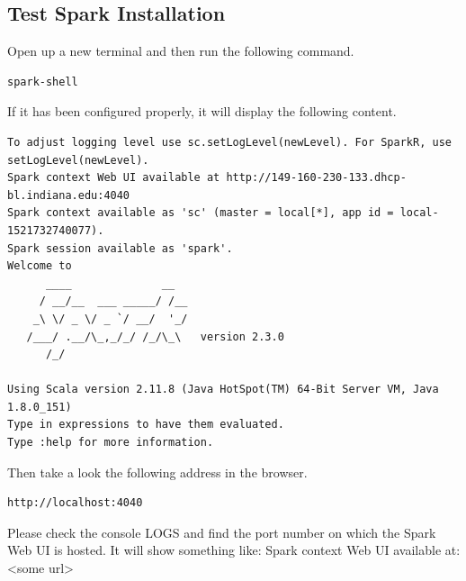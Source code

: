 \subsection{Test Spark Installation}

Open up a new terminal and then run the following command.

\begin{lstlisting}
spark-shell
\end{lstlisting}

If it has been configured properly, it will display the following content.

\begin{lstlisting}
To adjust logging level use sc.setLogLevel(newLevel). For SparkR, use setLogLevel(newLevel).
Spark context Web UI available at http://149-160-230-133.dhcp-bl.indiana.edu:4040
Spark context available as 'sc' (master = local[*], app id = local-1521732740077).
Spark session available as 'spark'.
Welcome to
      ____              __
     / __/__  ___ _____/ /__
    _\ \/ _ \/ _ `/ __/  '_/
   /___/ .__/\_,_/_/ /_/\_\   version 2.3.0
      /_/
         
Using Scala version 2.11.8 (Java HotSpot(TM) 64-Bit Server VM, Java 1.8.0_151)
Type in expressions to have them evaluated.
Type :help for more information.
\end{lstlisting}

Then take a look the following address in the browser.
\begin{lstlisting}
http://localhost:4040
\end{lstlisting}

\begin{NOTE}
  Please check the console LOGS and find the port number on which the
  Spark Web UI is hosted. It will show something like:
  Spark context Web UI available at: <some url>
\end{NOTE}


